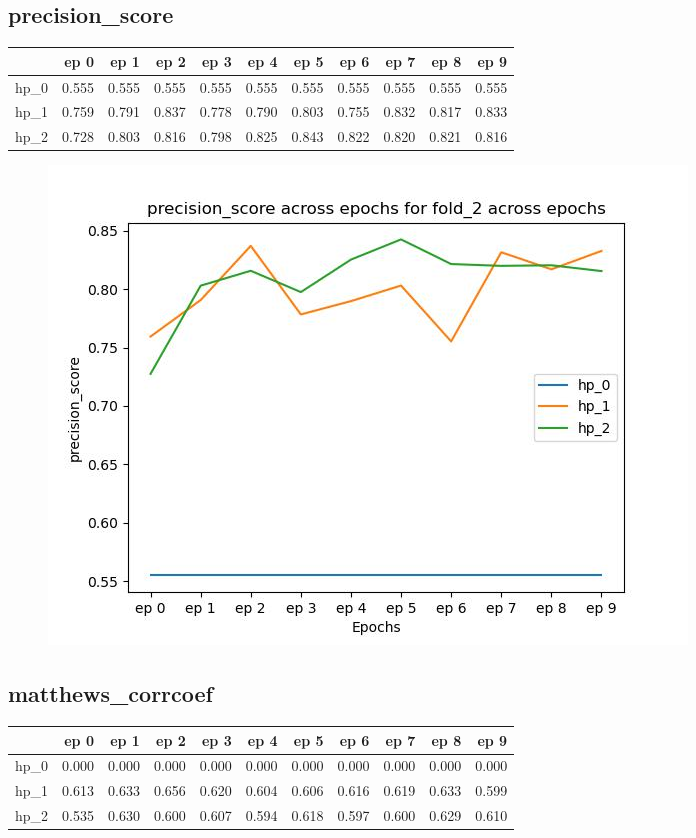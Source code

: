 \documentclass{article}
\begin{document}
\subsection{precision\_score}
\begin{tabular}{lrrrrrrrrrr}
\toprule
{} &   ep 0 &   ep 1 &   ep 2 &   ep 3 &   ep 4 &   ep 5 &   ep 6 &   ep 7 &   ep 8 &   ep 9 \\
\midrule
hp\_0 &  0.555 &  0.555 &  0.555 &  0.555 &  0.555 &  0.555 &  0.555 &  0.555 &  0.555 &  0.555 \\
hp\_1 &  0.759 &  0.791 &  0.837 &  0.778 &  0.790 &  0.803 &  0.755 &  0.832 &  0.817 &  0.833 \\
hp\_2 &  0.728 &  0.803 &  0.816 &  0.798 &  0.825 &  0.843 &  0.822 &  0.820 &  0.821 &  0.816 \\
\bottomrule
\end{tabular}

\begin{figure}[H]
\includegraphics[scale = 0.75]{fold_2/precision_score}
\end{figure}
\subsection{matthews\_corrcoef}
\begin{tabular}{lrrrrrrrrrr}
\toprule
{} &   ep 0 &   ep 1 &   ep 2 &   ep 3 &   ep 4 &   ep 5 &   ep 6 &   ep 7 &   ep 8 &   ep 9 \\
\midrule
hp\_0 &  0.000 &  0.000 &  0.000 &  0.000 &  0.000 &  0.000 &  0.000 &  0.000 &  0.000 &  0.000 \\
hp\_1 &  0.613 &  0.633 &  0.656 &  0.620 &  0.604 &  0.606 &  0.616 &  0.619 &  0.633 &  0.599 \\
hp\_2 &  0.535 &  0.630 &  0.600 &  0.607 &  0.594 &  0.618 &  0.597 &  0.600 &  0.629 &  0.610 \\
\bottomrule
\end{tabular}
\end{document}
